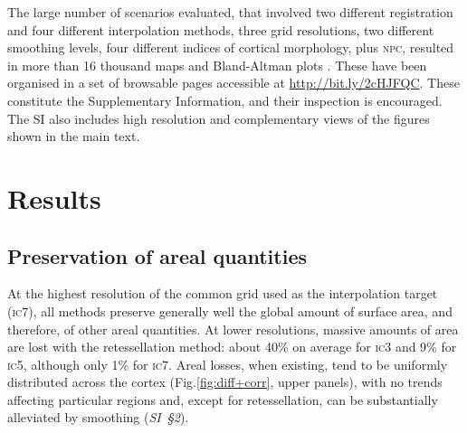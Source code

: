 The large number of scenarios evaluated, that involved two different registration and four different interpolation methods, three grid resolutions, two different smoothing levels, four different indices of cortical morphology, plus \textsc{npc}, resulted in more than 16 thousand maps and Bland-Altman plots \citep{Bland1986}. These have been organised in a set of browsable pages accessible at \href{http://bit.ly/2cHJFQC}{http://bit.ly/2cHJFQC}. These constitute the Supplementary Information, and their inspection is encouraged. The SI also includes high resolution and complementary views of the figures shown in the main text.

\section{Results}
\label{sec:cortex:results}

\subsection{Preservation of areal quantities}

At the highest resolution of the common grid used as the interpolation target (\textsc{ic}7), all methods preserve generally well the global amount of surface area, and therefore, of other areal quantities. At lower resolutions, massive amounts of area are lost with the retessellation method: about 40\% on average for \textsc{ic}3 and 9\% for \textsc{ic}5, although only 1\% for \textsc{ic}7. Areal losses, when existing, tend to be uniformly distributed across the cortex (Fig.\ref{fig:diff+corr}, upper panels), with no trends affecting particular regions and, except for retessellation, can be substantially alleviated by smoothing (\emph{SI~§2}).

\begin{figure}[p!]
\end{figure}

